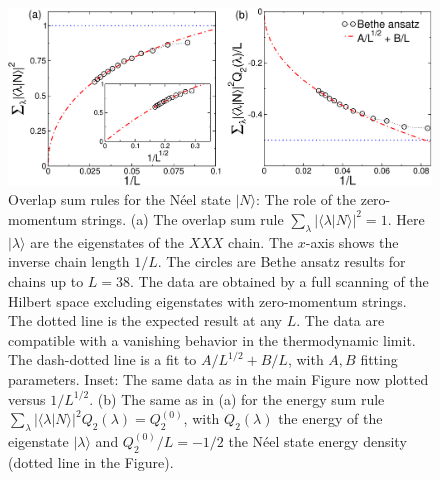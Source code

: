 \documentclass[11pt]{iopart}
\begin{document}
\begin{figure}[t]
\begin{center}
\includegraphics[width=.9\textwidth]{./draft_figs/Neel}
\end{center}
\caption{Overlap sum rules for the N\'eel state $|N\rangle$: The role of 
 the zero-momentum strings. (a) The overlap sum rule $\sum_{\lambda}|
 \langle\lambda|N\rangle|^2=1$. Here $|\lambda\rangle$ are the eigenstates  
 of the $XXX$ chain. The $x$-axis shows the inverse chain length $1/L$. 
 The circles are Bethe ansatz results for chains up to $L=38$. 
 The data are obtained by  a full scanning of the  Hilbert space excluding eigenstates  
 with  zero-momentum strings. 
 The dotted line is the expected result at any $L$. 
 The data are compatible with a vanishing behavior in the thermodynamic limit. 
 The dash-dotted line is a fit to $A/L^{1/2}+B/L$, with $A,B$ fitting parameters. 
 Inset: The same data as in the main Figure now plotted versus $1/L^{1/2}$. 
 (b) The same as in (a) for the energy sum rule $\sum_{\lambda}|\langle
 \lambda|N\rangle|^2Q_2(\lambda)=Q_2^{(0)}$, with $Q_2(\lambda)$ the 
 energy of the eigenstate $|\lambda\rangle$ and $Q_2^{(0)}/L=-1/2$ the 
 N\'eel state energy density (dotted line in the Figure). 
}
\label{fig1:Neel-sr}
\end{figure}
\end{document}
